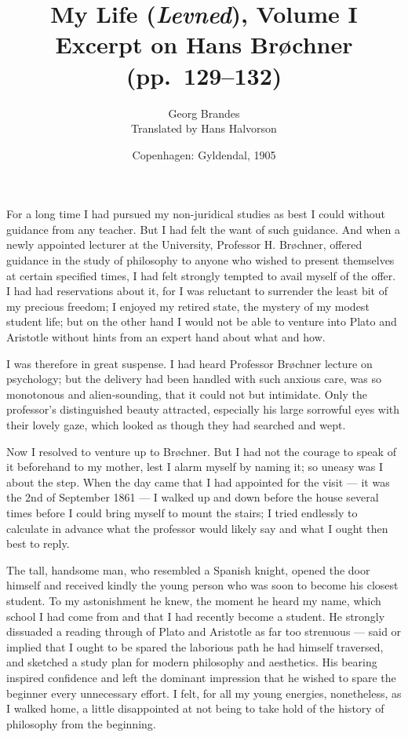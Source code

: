 \documentclass[12pt,a4paper]{article}
\title{\textbf{My Life} (\textit{Levned}), Volume I\\[6pt]
  \large Excerpt on Hans Brøchner (pp.\ 129--132)}
\author{Georg Brandes\\[4pt]
  \small Translated by Hans Halvorson}
\date{Copenhagen: Gyldendal, 1905}
\newcommand{\pnum}[1]{\noindent\makebox[0pt][r]{\small\textit{[#1]}\quad}}
\begin{document}
\maketitle
\thispagestyle{fancy}

\bigskip

\noindent For a long time I had pursued my non-juridical studies as
best I could without guidance from any teacher. But I had felt the want
of such guidance. And when a newly appointed lecturer at the University,
Professor H. Brøchner, offered guidance in the study of philosophy to
anyone who wished to present themselves at certain specified times, I
had felt strongly tempted to avail myself of the offer. I had had
reservations about it, for I was reluctant to surrender the least bit
of my precious freedom; I enjoyed my retired state, the mystery of my
modest student life; but on the other hand I would not be able to
venture into Plato and Aristotle without hints from an expert hand about
what and how.

I was therefore in great suspense. I had heard Professor Brøchner
lecture on psychology; but the delivery had been handled with such
anxious care, was so monotonous and alien-sounding, that it could not
but intimidate. Only the professor's distinguished beauty attracted,
especially his large sorrowful eyes with their lovely gaze, which
looked as though they had searched and wept.

\pnum{130}Now I resolved to venture up to Brøchner. But I had not
the courage to speak of it beforehand to my mother, lest I alarm myself
by naming it; so uneasy was I about the step. When the day came that I
had appointed for the visit --- it was the 2nd of September 1861 --- I
walked up and down before the house several times before I could bring
myself to mount the stairs; I tried endlessly to calculate in advance
what the professor would likely say and what I ought then best to reply.

The tall, handsome man, who resembled a Spanish knight, opened the
door himself and received kindly the young person who was soon to become
his closest student. To my astonishment he knew, the moment he heard my
name, which school I had come from and that I had recently become a
student. He strongly dissuaded a reading through of Plato and Aristotle
as far too strenuous --- said or implied that I ought to be spared the
laborious path he had himself traversed, and sketched a study plan for
modern philosophy and aesthetics. His bearing inspired confidence and
left the dominant impression that he wished to spare the beginner every
unnecessary effort. I felt, for all my young energies, nonetheless, as
I walked home, a little disappointed at not being to take hold of the
history of philosophy from the beginning.
\end{document}
